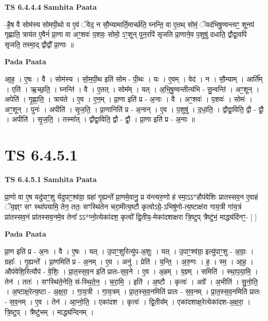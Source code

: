 \documentclass[17pt]{extarticle}
\begin{document}
\textbf{TS 6.4.4.4 } \newline
\textbf{Samhita Paata} \newline

-है॒ष वै सोम॑स्य सोमपी॒थो य ए॒वं ॅवेद॒ न सौ॒म्यामार्ति॒मार्च्छ॑ति॒ घ्नन्ति॒ वा ए॒तथ् सोमं॒ ॅयद॑भिषु॒ण्वन्त्यꣳ॒॒ शूनप॑ गृह्णाति॒ त्राय॑त ए॒वैनं॑ प्रा॒णा वा अꣳ॒॒शवः॑ प॒शवः॒ सोमो॒ ऽꣳ॒शून् पुन॒रपि॑ सृजति प्रा॒णाने॒व प॒शुषु॑ दधाति॒ द्वौद्वा॒वपि॑ सृजति॒ तस्मा॒द् द्वौद्वौ᳚ प्रा॒णाः ॥ \newline

\textbf{Pada Paata} \newline

आ॒ह॒ । ए॒षः । वै । सोम॑स्य । सो॒म॒पी॒थ इति॑ सोम - पी॒थः । यः । ए॒वम् । वेद॑ । न । सौ॒म्याम् । आर्ति᳚म् । एति॑ । ऋ॒च्छ॒ति॒ । घ्नन्ति॑ । वै । ए॒तत् । सोम᳚म् । यत् । अ॒भि॒षु॒ण्वन्तीत्य॑भि - सु॒न्वन्ति॑ । अꣳ॒॒शून् । अपेति॑ । गृ॒ह्णा॒ति॒ । त्राय॑ते । ए॒व । ए॒न॒म् । प्रा॒णा इति॑ प्र - अ॒नाः । वै । अꣳ॒॒शवः॑ । प॒शवः॑ । सोमः॑ । अꣳ॒॒शून् । पुनः॑ । अपीति॑ । सृ॒ज॒ति॒ । प्रा॒णानिति॑ प्र - अ॒नान् । ए॒व । प॒शुषु॑ । द॒धा॒ति॒ । द्वौद्वा॒विति॒ द्वौ - द्वौ॒ । अपीति॑ । सृ॒ज॒ति॒ । तस्मा᳚त् । द्वौद्वा॒विति॒ द्वौ - द्वौ॒ । प्रा॒णा इति॑ प्र - अ॒नाः ॥  \newline




\section*{ TS 6.4.5.1 }

\textbf{TS 6.4.5.1 } \newline
\textbf{Samhita Paata} \newline

प्रा॒णो वा ए॒ष यदु॑पाꣳ॒॒शु र्यदुपाꣳ॒॒श्व॑ग्रा॒ ग्रहा॑ गृ॒ह्यन्ते᳚ प्रा॒णमे॒वानु॒ प्र य॑न्त्यरु॒णो ह॑ स्मा॒ऽऽ*हौप॑वेशिः प्रातस्सव॒न ए॒वाहं ॅय॒ज्ञ्ꣳ सꣳ स्था॑पयामि॒ तेन॒ ततः॒ सꣳस्थि॑तेन चरा॒मीत्य॒ष्टौ कृत्वोऽग्रे॒-ऽभिषु॑णो-त्य॒ष्टाक्ष॑रा गाय॒त्री गा॑य॒त्रं प्रा॑तस्सव॒नं प्रा॑तस्सव॒नमे॒व तेना᳚ ऽऽ*प्नो॒त्येका॑दश॒ कृत्वो᳚ द्वि॒तीय॒-मेका॑दशाक्षरा त्रि॒ष्टुप् त्रैष्टु॑भं॒ माद्ध्य॑दिंनꣳ॒॒- [  ] \newline

\textbf{Pada Paata} \newline

प्रा॒ण इति॑ प्र - अ॒नः । वै । ए॒षः । यत् । उ॒पाꣳ॒॒शुरित्यु॑प-अ॒शुः । यत् । उ॒पाꣳ॒॒श्व॑ग्रा॒ इत्यु॑पाꣳ॒॒शु - अ॒ग्राः॒ । ग्रहाः᳚ । गृ॒ह्यन्ते᳚ । प्रा॒णमिति॑ प्र - अ॒नम् । ए॒व । अनु॑ । प्रेति॑ । य॒न्ति॒ । अ॒रु॒णः । ह॒ । स्म॒ । आ॒ह॒ । औप॑वेशि॒रित्यौप॑ - वे॒शिः॒ । प्रा॒त॒स्स॒व॒न इति॑ प्रातः-स॒व॒ने । ए॒व । अ॒हम् । य॒ज्ञ्म् । समिति॑ । स्था॒प॒या॒मि॒ । तेन॑ । ततः॑ । सꣳस्थि॑ते॒नेति॒ सं-स्थि॒ते॒न॒ । च॒रा॒मि॒ । इति॑ । अ॒ष्टौ । कृत्वः॑ । अग्रे᳚ । अ॒भीति॑ । सु॒नो॒ति॒ । अ॒ष्टाक्ष॒रेत्य॒ष्टा - अ॒क्ष॒रा॒ । गा॒य॒त्री । गा॒य॒त्रम् । प्रा॒त॒स्स॒व॒नमिति॑ प्रातः - स॒व॒नम् । प्रा॒त॒स्स॒व॒नमिति॑ प्रातः - स॒व॒नम् । ए॒व । तेन॑ । आ॒प्नो॒ति॒ । एका॑दश । कृत्वः॑ । द्वि॒तीय᳚म् । एका॑दशाक्ष॒रेत्येका॑दश-अ॒क्ष॒रा॒ । त्रि॒ष्टुप् । त्रैष्टु॑भम् । माद्ध्य॑न्दिनम् ।  \newline
\end{document}
